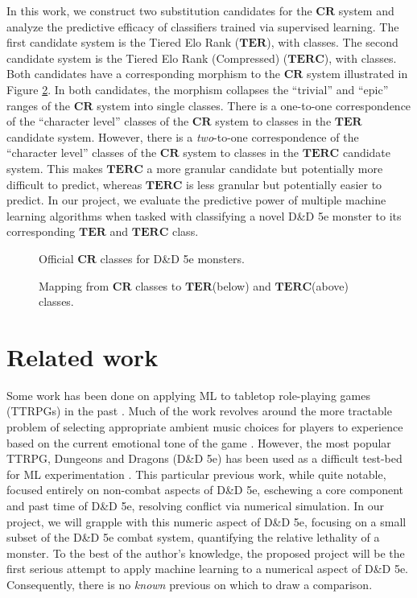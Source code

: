 \documentclass{article}
\newcommand{\Qty}[1]{\oldstylenums{#1}}
\newcommand{\CR}{\ensuremath{\mathbf{CR}}\xspace}
\newcommand{\TER}{\ensuremath{\mathbf{TER}}\xspace}
\newcommand{\TERC}{\ensuremath{\mathbf{TERC}}\xspace}
\newcommand{\DnD}{D\&D 5e\xspace}
\begin{document}
In this work, we construct two substitution candidates for the \CR system and analyze the predictive efficacy of classifiers trained via supervised learning.
The first candidate system is the Tiered Elo Rank (\TER), with \Qty{22} classes.
The second candidate system is the Tiered Elo Rank (Compressed) (\TERC), with \Qty{12} classes.
Both candidates have a corresponding morphism to the \CR system illustrated in Figure \ref{fig:CR-Mapping}.
In both candidates, the morphism collapses the ``trivial'' and ``epic'' ranges of the \CR system into single classes.
There is a one-to-one correspondence of the ``character level'' classes of the \CR system to classes in the \TER candidate system.
However, there is a \emph{two}-to-one correspondence of the ``character level'' classes of the \CR system to classes in the \TERC candidate system.
This makes \TERC a more granular candidate but potentially more difficult to predict, whereas \TERC is less granular but potentially easier to predict.
In our project, we evaluate the predictive power of multiple machine learning algorithms when tasked with classifying a novel \DnD monster to its corresponding \TER and \TERC class.


\begin{figure}[htb]
\centering
\resizebox{\textwidth}{!}{}
\caption{Official \CR classes for \DnD monsters.}\label{fig:CR-Classes}
\end{figure}


\begin{figure}[htb]
\centering
\resizebox{\textwidth}{!}{}
\caption{Mapping from \CR classes to \TER(below) and \TERC (above) classes.}\label{fig:CR-Mapping}
\end{figure}


\section{Related work}
Some work has been done on applying ML to tabletop role-playing games (TTRPGs) in the past \cite{rameshkumar2020storytelling, macinnes2019d, cavanaugh2016machine, faria2019adaptive, riedl2013interactive}.
Much of the work revolves around the more tractable problem of selecting appropriate ambient music choices for players to experience based on the current emotional tone of the game \cite{ferreira2017mtg, risi2020increasing, padovani2017bardo, ferreira2020computer}.
However, the most popular TTRPG, Dungeons and Dragons (\DnD) has been used as a difficult test-bed for ML experimentation \cite{martin2018dungeons}.
This particular previous work, while quite notable, focused entirely on non-combat aspects of \DnD, eschewing a core component and past time of \DnD, resolving conflict via numerical simulation.
In our project, we will grapple with this numeric aspect of \DnD, focusing on a small subset of the \DnD combat system, quantifying the relative lethality of a monster.
To the best of the author's knowledge, the proposed project will be the first serious attempt to apply machine learning to a numerical aspect of \DnD.
Consequently, there is no \emph{known} previous on which to draw a comparison.
\end{document}
